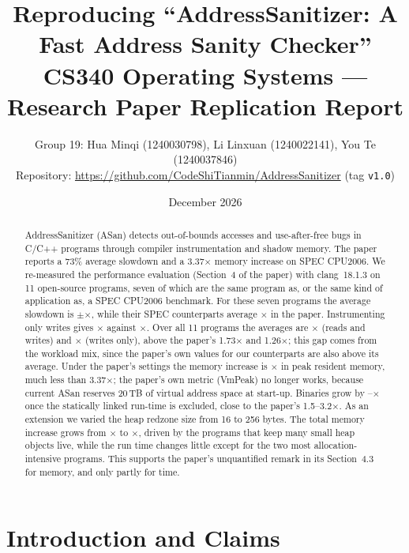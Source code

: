 \documentclass[10pt,a4paper]{article}
\title{\textbf{Reproducing ``AddressSanitizer: A Fast Address Sanity Checker''}\\[2pt]
\large CS340 Operating Systems --- Research Paper Replication Report}
\author{Group 19:\;
Hua Minqi (1240030798),\; Li Linxuan (1240022141),\; You Te (1240037846)\\[2pt]
\small Repository: \url{https://github.com/CodeShiTianmin/AddressSanitizer} (tag \texttt{v1.0})}
\date{December 2026}
\newcommand{\asan}{ASan}
\begin{document}
\maketitle

\begin{abstract}
\noindent
AddressSanitizer (\asan{}) detects out-of-bounds accesses and use-after-free
bugs in C/C++ programs through compiler instrumentation and shadow memory.
The paper reports a 73\% average slowdown and a 3.37$\times$ memory increase on
SPEC CPU2006. We re-measured the performance evaluation (Section~4 of the
paper) with clang~18.1.3 on 11 open-source programs, seven of which are the
same program as, or the same kind of application as, a SPEC CPU2006 benchmark.
For these seven programs the average slowdown is
\OurMapRW$\pm$\OurMapRWsd$\times$, while their SPEC counterparts average
\PaperMapRW$\times$ in the paper. Instrumenting only writes gives
\OurMapWO$\times$ against \PaperMapWO$\times$. Over all 11 programs the
averages are \OurAvgRW$\times$ (reads and writes) and \OurAvgWO$\times$
(writes only), above the paper's 1.73$\times$ and 1.26$\times$; this gap
comes from the workload mix, since the paper's own values for our counterparts
are also above its average. Under the paper's settings
the memory increase is \OurMemTotal$\times$ in peak resident memory, much less
than 3.37$\times$; the paper's own metric (VmPeak) no longer works, because
current \asan{} reserves 20\,TB of virtual address space at start-up. Binaries
grow by \CodeMin--\CodeMax$\times$ once the statically linked run-time is
excluded, close to the paper's 1.5--3.2$\times$. As an extension we varied the
heap redzone size from 16 to 256 bytes. The total memory increase grows from
\RzMsixteen$\times$ to \RzMtwofiftysix$\times$, driven by the programs that keep
many small heap objects live, while the run time changes little except for the
two most allocation-intensive programs. This supports the paper's
unquantified remark in its Section~4.3 for memory, and only partly for time.
\end{abstract}

\section{Introduction and Claims}\label{sec:intro}
\end{document}
